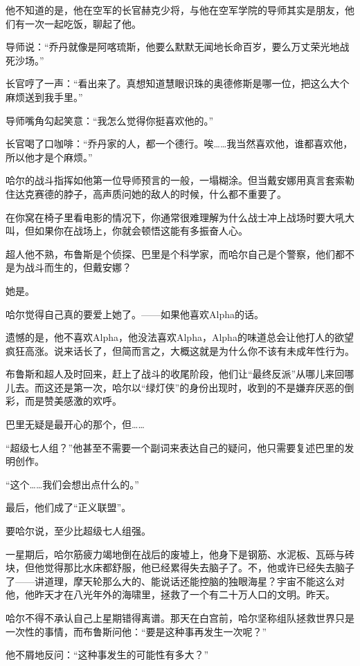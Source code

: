 \documentclass[../main]{subfiles}
\begin{document}
他不知道的是，他在空军的长官赫克少将，与他在空军学院的导师其实是朋友，他们有一次一起吃饭，聊起了他。

导师说：“乔丹就像是阿喀琉斯，他要么默默无闻地长命百岁，要么万丈荣光地战死沙场。”

长官哼了一声：“看出来了。真想知道慧眼识珠的奥德修斯是哪一位，把这么大个麻烦送到我手里。”

导师嘴角勾起笑意：“我怎么觉得你挺喜欢他的。”

长官喝了口咖啡：“乔丹家的人，都一个德行。唉……我当然喜欢他，谁都喜欢他，所以他才是个麻烦。”

哈尔的战斗指挥如他第一位导师预言的一般，一塌糊涂。但当戴安娜用真言套索勒住达克赛德的脖子，高声质问她的敌人的时候，什么都不重要了。

在你窝在椅子里看电影的情况下，你通常很难理解为什么战士冲上战场时要大吼大叫，但如果你在战场上，你就会顿悟这能有多振奋人心。

超人他不熟，布鲁斯是个侦探、巴里是个科学家，而哈尔自己是个警察，他们都不是为战斗而生的，但戴安娜？

她是。

哈尔觉得自己真的要爱上她了。——如果他喜欢Alpha的话。

遗憾的是，他不喜欢Alpha，他没法喜欢Alpha，Alpha的味道总会让他打人的欲望疯狂高涨。说来话长了，但简而言之，大概这就是为什么你不该有未成年性行为。

布鲁斯和超人及时回来，赶上了战斗的收尾阶段，他们让“最终反派”从哪儿来回哪儿去。而这还是第一次，哈尔以“绿灯侠”的身份出现时，收到的不是嫌弃厌恶的倒彩，而是赞美感激的欢呼。

巴里无疑是最开心的那个，但……

“超级七人组？”他甚至不需要一个副词来表达自己的疑问，他只需要复述巴里的发明创作。

“这个……我们会想出点什么的。”

最后，他们成了“正义联盟”。

要哈尔说，至少比超级七人组强。

一星期后，哈尔筋疲力竭地倒在战后的废墟上，他身下是钢筋、水泥板、瓦砾与砖块，但他觉得那比水床都舒服，他已经累得失去脑子了。不，他或许已经失去脑子了——讲道理，摩天轮那么大的、能说话还能控脑的独眼海星？宇宙不能这么对他，他昨天才在八光年外的海啸里，拯救了一个有二十万人口的文明。昨天。

哈尔不得不承认自己上星期错得离谱。那天在白宫前，哈尔坚称组队拯救世界只是一次性的事情，而布鲁斯问他：“要是这种事再发生一次呢？”

他不屑地反问：“这种事发生的可能性有多大？”
\end{document}
